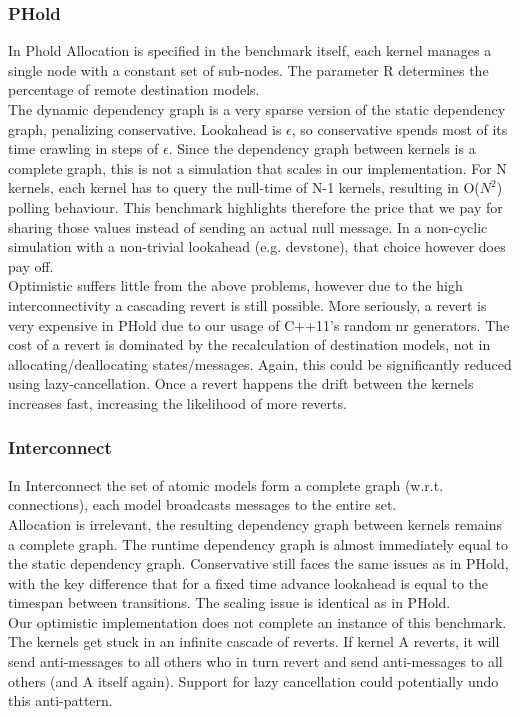 \subsubsection{PHold}
In Phold \cite{PHOLD} Allocation is specified in the benchmark itself, each kernel manages a single node with a constant set of sub-nodes. The parameter R determines the percentage of remote destination models.\\
The dynamic dependency graph is a very sparse version of the static dependency graph, penalizing conservative. Lookahead is $\epsilon$, so conservative spends most of its time crawling in steps of $\epsilon$. Since the dependency graph between kernels is a complete graph, this is not a simulation that scales in our implementation. For N kernels, each kernel has to query the null-time of N-1 kernels, resulting in O($N^2$) polling behaviour. This benchmark highlights therefore the price that we pay for sharing those values instead of sending an actual null message. In a non-cyclic simulation with a non-trivial lookahead (e.g. devstone), that choice however does pay off.\\
Optimistic suffers little from the above problems, however due to the high interconnectivity a cascading revert is still possible. More seriously, a revert is very expensive in PHold due to our usage of C++11's random nr generators. The cost of a revert is dominated by the recalculation of destination models, not in allocating/deallocating states/messages. Again, this could be significantly reduced using lazy-cancellation. Once a revert happens the drift between the kernels increases fast, increasing the likelihood of more reverts. 

\subsubsection{Interconnect}
In Interconnect
the set of atomic models form a complete graph (w.r.t. connections), each model broadcasts messages to the entire set. \\
Allocation is irrelevant, the resulting dependency graph between kernels remains  a complete graph. The runtime dependency graph is almost immediately equal to the static dependency graph.
Conservative still faces the same issues as in PHold, with the key difference that for a fixed time advance lookahead is equal to the timespan between transitions. The scaling issue is identical as in PHold.\\
Our optimistic implementation does not complete an instance of this benchmark. The kernels get stuck in an infinite cascade of reverts. If kernel A reverts, it will send anti-messages to all others who in turn revert and send anti-messages to all others (and A itself again). Support for lazy cancellation could potentially undo this anti-pattern.
